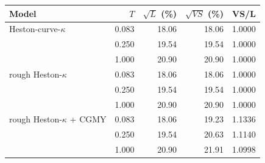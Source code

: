 \begin{tabular}{lrrrr}
\toprule
Model & $T$ & $\sqrt{L}$ (\%) & $\sqrt{VS}$ (\%) & VS/L\\
\midrule
Heston-curve-$\kappa$ & 0.083 & 18.06 & 18.06 & 1.0000\\
 & 0.250 & 19.54 & 19.54 & 1.0000\\
 & 1.000 & 20.90 & 20.90 & 1.0000\\
\addlinespace
rough Heston-$\kappa$ & 0.083 & 18.06 & 18.06 & 1.0000\\
 & 0.250 & 19.54 & 19.54 & 1.0000\\
 & 1.000 & 20.90 & 20.90 & 1.0000\\
\addlinespace
rough Heston-$\kappa$ + CGMY & 0.083 & 18.06 & 19.23 & 1.1336\\
 & 0.250 & 19.54 & 20.63 & 1.1140\\
 & 1.000 & 20.90 & 21.91 & 1.0998\\
\bottomrule
\end{tabular}
